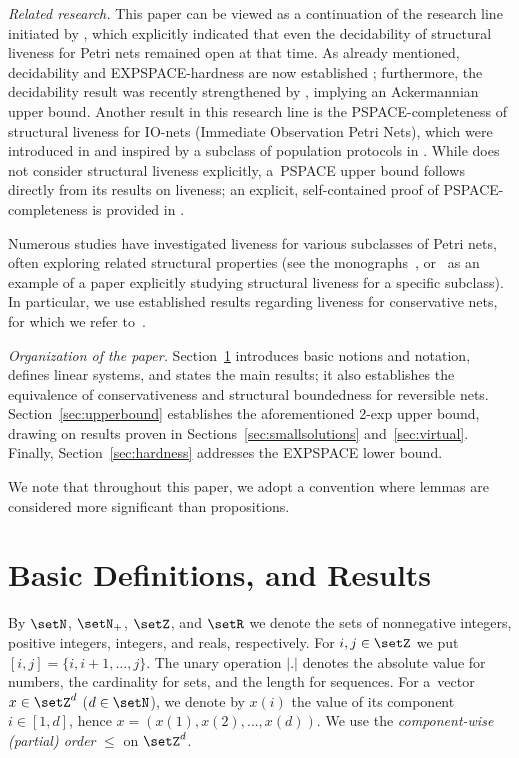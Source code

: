 \emph{Related research.}
This paper can be viewed as a continuation of the research line
initiated by \cite{DBLP:journals/ipl/BestE16}, which explicitly
indicated that even the decidability of structural liveness for Petri
nets remained open at that time. As already mentioned, decidability
and EXPSPACE-hardness are now established
\cite{DBLP:journals/acta/JancarP19}; furthermore, the decidability
result was recently strengthened by \cite{DBLP:conf/concur/JancarL23,
DBLP:journals/lmcs/JancarL24}, implying an Ackermannian upper bound.
Another result in this research line is the PSPACE-completeness of
structural liveness for IO-nets (Immediate Observation Petri Nets),
which were introduced in \cite{DBLP:conf/apn/EsparzaRW19} and inspired
by a subclass of population protocols in
\cite{DBLP:journals/dc/AngluinAER07}. While
\cite{DBLP:conf/apn/EsparzaRW19} does not consider structural liveness
explicitly, a~PSPACE upper bound follows directly from its results on liveness; an explicit, self-contained proof of PSPACE-completeness is provided in \cite{DBLP:journals/fuin/JancarV22}.


Numerous studies have investigated liveness for various subclasses of
Petri nets, often exploring related structural properties (see
the monographs~\cite{reisig2013, BestDevillers2024,
desel_esparza_1995}, or~\cite{DBLP:journals/fuin/HujsaD18} as 
an example of a paper explicitly studying structural liveness 
for a specific subclass). In particular, we use established results
regarding liveness for conservative nets, for which we refer to~\cite{DBLP:conf/apn/MayrW14}.




\emph{Organization of the paper.} 
Section~\ref{sec:basicdef} introduces basic notions and notation,
defines linear systems, 
and states the main results; it also establishes the equivalence of conservativeness and structural boundedness for reversible nets. Section~\ref{sec:upperbound} establishes the aforementioned 2-exp upper bound, drawing on results proven in Sections~\ref{sec:smallsolutions} and~\ref{sec:virtual}. Finally, Section~\ref{sec:hardness} addresses the EXPSPACE lower bound.

We note that throughout this paper, we adopt a convention where lemmas are considered more significant than propositions.
\section{Basic Definitions, and Results}\label{sec:basicdef}
By $\setN$, $\setN_+$, $\setZ$, and $\setR$ we denote the sets of nonnegative
integers, positive integers, integers, and reals, respectively.
For $i,j\in\setZ$ we put $[i,j]=\{i,i{+}1,\dots,j\}$.
The unary operation $|.|$ denotes the absolute value for numbers, the
cardinality for sets, and the length for sequences.
For a~vector $x\in\setZ^d$ ($d\in\setN$), we denote by $x(i)$ the value of its
component $i\in[1,d]$, 
hence $x=(x(1),x(2),\ldots,x(d))$. 
We use the \emph{component-wise (partial) order} $\leq$ on $\setZ^d$.


